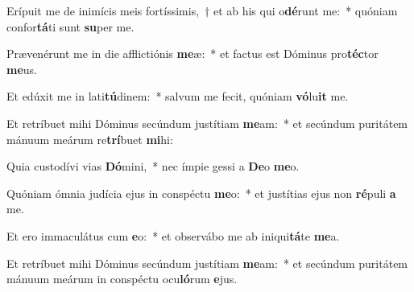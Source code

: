 \item Erípuit me de inimícis meis fortíssimis,~† et ab his qui o\textbf{dé}runt me:~* quóniam confor\textbf{tá}ti sunt \textbf{su}per me.
\item Prævenérunt me in die afflictiónis \textbf{me}æ:~* et factus est Dóminus pro\textbf{téc}tor \textbf{me}us.
\item Et edúxit me in lati\textbf{tú}dinem:~* salvum me fecit, quóniam \textbf{vó}lu\textbf{it} me.
\item Et retríbuet mihi Dóminus secúndum justítiam \textbf{me}am:~* et secúndum puritátem mánuum meárum re\textbf{trí}buet \textbf{mi}hi:
\item Quia custodívi vias \textbf{Dó}mini,~* nec ímpie gessi a \textbf{De}o \textbf{me}o.
\item Quóniam ómnia judícia ejus in conspéctu \textbf{me}o:~* et justítias ejus non \textbf{ré}puli \textbf{a} me.
\item Et ero immaculátus cum \textbf{e}o:~* et observábo me ab iniqui\textbf{tá}te \textbf{me}a.
\item Et retríbuet mihi Dóminus secúndum justítiam \textbf{me}am:~* et secúndum puritátem mánuum meárum in conspéctu ocu\textbf{ló}rum \textbf{e}jus.
